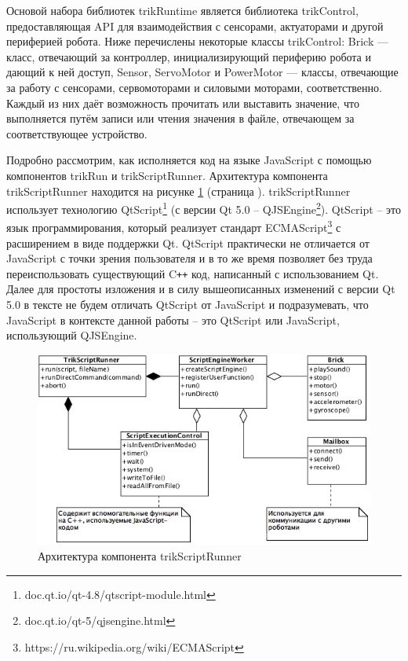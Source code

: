 \documentclass[14pt]{matmex-diploma-custom}
\begin{document}
Основой набора библиотек trikRuntime является библиотека trikControl, предоставляющая API для взаимодействия с сенсорами, актуаторами и другой периферией робота. Ниже перечислены некоторые классы trikControl: Brick — класс, отвечающий за контроллер, инициализирующий периферию робота и дающий к ней доступ, Sensor, ServoMotor и PowerMotor — классы, отвечающие за работу с сенсорами, сервомоторами и силовыми моторами, соответственно. Каждый из них даёт возможность прочитать или выставить значение, что выполняется путём записи или чтения значения в файле, отвечающем за соответствующее устройство.


Подробно рассмотрим, как исполняется код на языке JavaScript с помощью компонентов trikRun и trikScriptRunner. Архитектура компонента trikScriptRunner находится на рисунке \ref{trikScriptRunner} (страница \pageref{trikScriptRunner}). trikScriptRunner использует технологию QtScript\footnote{doc.qt.io/qt-4.8/qtscript-module.html} (с версии Qt 5.0 -- QJSEngine\footnote{doc.qt.io/qt-5/qjsengine.html}). QtScript -- это язык программирования, который реализует стандарт ECMAScript\footnote{https://ru.wikipedia.org/wiki/ECMAScript} с расширением в виде поддержки Qt. QtScript практически не отличается от JavaScript с точки зрения пользователя и в то же время позволяет без труда переиспользовать существующий C\texttt{++} код, написанный с использованием Qt. Далее для простоты изложения и в силу вышеописанных изменений с версии Qt 5.0 в тексте не будем отличать QtScript от JavaScript и подразумевать, что JavaScript в контексте данной работы -- это QtScript или JavaScript, использующий QJSEngine.

\begin{figure}[h]
	\includegraphics[width=\textwidth]{images/trikScriptRunner.jpg}
	\caption{Архитектура компонента trikScriptRunner}
	\label{trikScriptRunner}
\end{figure}
\end{document}
